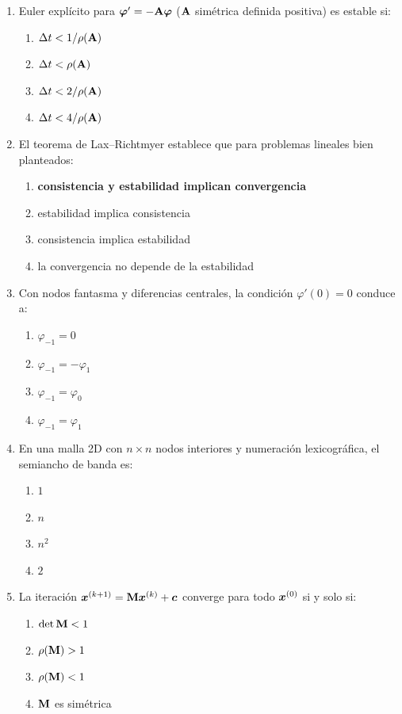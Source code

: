 \begin{enumerate}[label=\textbf{\arabic*.},leftmargin=*,itemsep=8pt]
	\item Euler explícito para $\bm{\varphi}' = -\mathbf{A}\bm{\varphi}$ ($\mathbf{A}$ simétrica definida positiva) es estable si:
	\begin{enumerate}[label=\alph*)]
		\item $\Delta t < 1/\rho(\mathbf{A})$ 
		\item $\Delta t < \rho(\mathbf{A})$ 
		\item {\bfseries\boldmath\color{red} $\Delta t < 2/\rho(\mathbf{A})$} 
		\item $\Delta t < 4/\rho(\mathbf{A})$
	\end{enumerate}
	
	\item El teorema de Lax--Richtmyer establece que para problemas lineales bien planteados:
	\begin{enumerate}[label=\alph*)]
		\item {\bfseries\boldmath\color{red} consistencia y estabilidad implican convergencia} 
		\item estabilidad implica consistencia
		\item consistencia implica estabilidad 
		\item la convergencia no depende de la estabilidad
	\end{enumerate}
	
	\item Con nodos fantasma y diferencias centrales, la condición $\varphi'(0) = 0$ conduce a:
	\begin{enumerate}[label=\alph*)]
		\item $\varphi_{-1} = 0$ 
		\item $\varphi_{-1} = -\varphi_1$ 
		\item $\varphi_{-1} = \varphi_0$ 
		\item {\bfseries\boldmath\color{red} $\varphi_{-1} = \varphi_1$}
	\end{enumerate}
	
	\item En una malla 2D con $n\times n$ nodos interiores y numeración lexicográfica, el semiancho de banda es:
	\begin{enumerate}[label=\alph*)]
		\item $1$ 
		\item {\bfseries\boldmath\color{red} $n$} 
		\item $n^2$ 
		\item $2$
	\end{enumerate}
	
	\item La iteración $\bm{x}^{(k+1)} = \mathbf{M}\bm{x}^{(k)} + \bm{c}$ converge para todo $\bm{x}^{(0)}$ si y solo si:
	\begin{enumerate}[label=\alph*)]
		\item $\det\mathbf{M} < 1$ 
		\item $\rho(\mathbf{M}) > 1$ 
		\item {\bfseries\boldmath\color{red} $\rho(\mathbf{M}) < 1$} \item $\mathbf{M}$ es simétrica
	\end{enumerate}
	

\end{enumerate}

